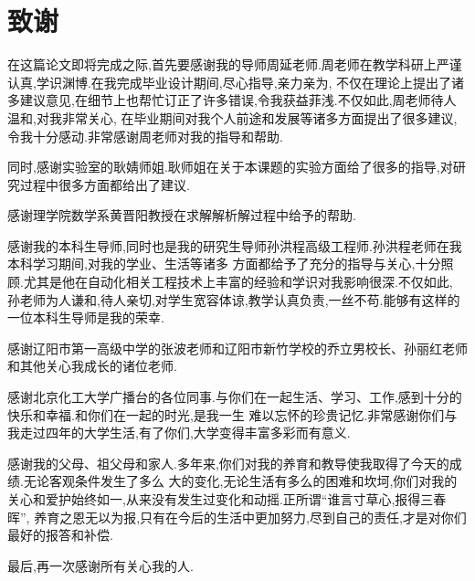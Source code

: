 \chapter*{致\qquad 谢}
在这篇论文即将完成之际,首先要感谢我的导师周延老师.周老师在教学科研上严谨认真,学识渊博.在我完成毕业设计期间,尽心指导,亲力亲为,
不仅在理论上提出了诸多建议意见,在细节上也帮忙订正了许多错误,令我获益菲浅.不仅如此,周老师待人温和,对我非常关心,
在毕业期间对我个人前途和发展等诸多方面提出了很多建议,令我十分感动.非常感谢周老师对我的指导和帮助.\par
同时,感谢实验室的耿婧师姐.耿师姐在关于本课题的实验方面给了很多的指导,对研究过程中很多方面都给出了建议.\par
感谢理学院数学系黄晋阳教授在求解解析解过程中给予的帮助.\par
感谢我的本科生导师,同时也是我的研究生导师孙洪程高级工程师.孙洪程老师在我本科学习期间,对我的学业、生活等诸多
方面都给予了充分的指导与关心,十分照顾.尤其是他在自动化相关工程技术上丰富的经验和学识对我影响很深.不仅如此,
孙老师为人谦和,待人亲切,对学生宽容体谅,教学认真负责,一丝不苟.能够有这样的一位本科生导师是我的荣幸.\par
感谢辽阳市第一高级中学的张波老师和辽阳市新竹学校的乔立男校长、孙丽红老师和其他关心我成长的诸位老师.\par
感谢北京化工大学广播台的各位同事.与你们在一起生活、学习、工作,感到十分的快乐和幸福.和你们在一起的时光,是我一生
难以忘怀的珍贵记忆.非常感谢你们与我走过四年的大学生活,有了你们,大学变得丰富多彩而有意义.\par
感谢我的父母、祖父母和家人.多年来,你们对我的养育和教导使我取得了今天的成绩.无论客观条件发生了多么
大的变化,无论生活有多么的困难和坎坷,你们对我的关心和爱护始终如一,从来没有发生过变化和动摇.正所谓``谁言寸草心,报得三春晖'',
养育之恩无以为报,只有在今后的生活中更加努力,尽到自己的责任,才是对你们最好的报答和补偿.\par
最后,再一次感谢所有关心我的人.